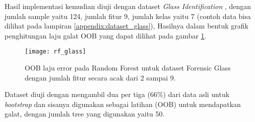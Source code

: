Hasil implementasi kemudian diuji dengan dataset \textit{Glass Identification}
\cite{evett1987rule}, dengan jumlah sample yaitu 124, jumlah fitur 9, jumlah
kelas yaitu 7 (contoh data bisa dilihat pada lampiran
\ref{appendix:dataset_glass}),
Hasilnya dalam bentuk grafik penghitungan laju galat OOB yang dapat dilihat
pada gambar \ref{fig:rf_glass}.

\begin{figure}[t]
	\centering
	\texttt{[image: rf\_glass]}
	\caption{OOB laju error pada Random Forest untuk dataset Forensic Glass
	dengan jumlah fitur secara acak dari 2 sampai 9.}
	\label{fig:rf_glass}
\end{figure}

Dataset diuji dengan mengambil dua per tiga (66\%) dari data asli untuk
\textit{bootstrap} dan sisanya digunakan sebagai latihan (OOB) untuk
mendapatkan galat, dengan jumlah tree yang digunakan yaitu 50.
